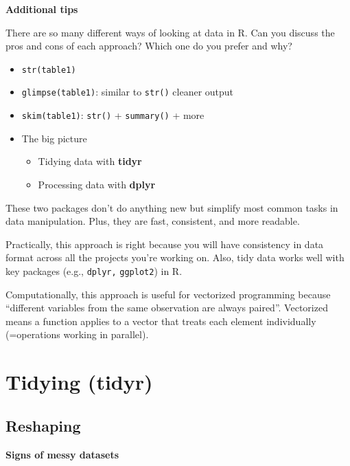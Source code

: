\documentclass[
]{book}
\providecommand{\tightlist}{%
  \setlength{\itemsep}{0pt}\setlength{\parskip}{0pt}}
\begin{document}
\textbf{Additional tips}

There are so many different ways of looking at data in R. Can you discuss the pros and cons of each approach? Which one do you prefer and why?

\begin{itemize}
\item
  \texttt{str(table1)}
\item
  \texttt{glimpse(table1)}: similar to \texttt{str()} cleaner output
\item
  \texttt{skim(table1)}: \texttt{str()} + \texttt{summary()} + more
\item
  The big picture

  \begin{itemize}
  \tightlist
  \item
    Tidying data with \textbf{tidyr}
  \item
    Processing data with \textbf{dplyr}
  \end{itemize}
\end{itemize}

These two packages don't do anything new but simplify most common tasks in data manipulation. Plus, they are fast, consistent, and more readable.

Practically, this approach is right because you will have consistency in data format across all the projects you're working on. Also, tidy data works well with key packages (e.g., \texttt{dplyr,} \texttt{ggplot2}) in R.

Computationally, this approach is useful for vectorized programming because ``different variables from the same observation are always paired''. Vectorized means a function applies to a vector that treats each element individually (=operations working in parallel).

\section{Tidying (tidyr)}\label{tidying-tidyr}

\subsection{Reshaping}\label{reshaping}

\textbf{Signs of messy datasets}
\end{document}
